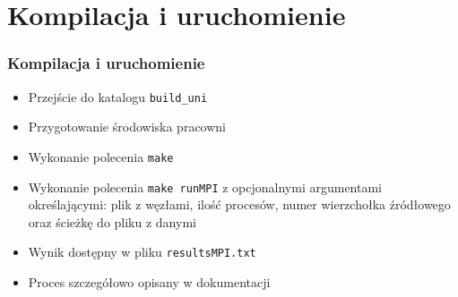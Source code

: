 \documentclass[10pt]{beamer}
\begin{document}
\section{Kompilacja i uruchomienie}

\begin{frame}
\frametitle{Kompilacja i uruchomienie}
\begin{itemize}
\item Przejście do katalogu \lstinline{build_uni}
\item Przygotowanie środowiska pracowni
\item Wykonanie polecenia \lstinline{make}
\item Wykonanie polecenia \lstinline{make runMPI} z opcjonalnymi argumentami określającymi: plik z węzłami, ilość procesów, numer wierzchołka źródłowego oraz ścieżkę do pliku z danymi
\item Wynik dostępny w pliku \lstinline{resultsMPI.txt}
\item Proces szczegółowo opisany w dokumentacji
\end{itemize}

\end{frame}
\end{document}
